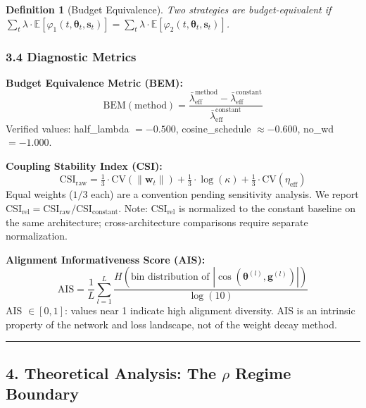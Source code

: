 \documentclass[
]{article}
\begin{document}
\textbf{Definition 1} (Budget Equivalence). \emph{Two strategies are
budget-equivalent if
\(\sum_{t} \lambda \cdot \mathbb{E}[\varphi_1(t, \boldsymbol{\theta}_t, \mathbf{s}_t)] = \sum_{t} \lambda \cdot \mathbb{E}[\varphi_2(t, \boldsymbol{\theta}_t, \mathbf{s}_t)]\).}

\hypertarget{diagnostic-metrics}{%
\subsubsection{3.4 Diagnostic Metrics}\label{diagnostic-metrics}}

\textbf{Budget Equivalence Metric (BEM):}
\[\mathrm{BEM}(\text{method}) = \frac{\bar{\lambda}_{\mathrm{eff}}^{\text{method}} - \bar{\lambda}_{\mathrm{eff}}^{\text{constant}}}{\bar{\lambda}_{\mathrm{eff}}^{\text{constant}}}\]
Verified values: half\_lambda \(= -0.500\), cosine\_schedule
\(\approx -0.600\), no\_wd \(= -1.000\).

\textbf{Coupling Stability Index (CSI):}
\[\mathrm{CSI}_{\mathrm{raw}} = \tfrac{1}{3} \cdot \mathrm{CV}(\|\mathbf{w}_t\|) + \tfrac{1}{3} \cdot \log(\kappa) + \tfrac{1}{3} \cdot \mathrm{CV}(\eta_{\mathrm{eff}})\]
Equal weights (\(1/3\) each) are a convention pending sensitivity
analysis. We report
\(\mathrm{CSI}_{\mathrm{rel}} = \mathrm{CSI}_{\mathrm{raw}} / \mathrm{CSI}_{\mathrm{constant}}\).
Note: \(\mathrm{CSI}_{\mathrm{rel}}\) is normalized to the constant
baseline on the same architecture; cross-architecture comparisons
require separate normalization.

\textbf{Alignment Informativeness Score (AIS):}
\[\mathrm{AIS} = \frac{1}{L}\sum_{l=1}^{L} \frac{H(\text{bin distribution of } |\cos(\boldsymbol{\theta}^{(l)}, \mathbf{g}^{(l)})|)}{\log(10)}\]
AIS \(\in [0, 1]\): values near 1 indicate high alignment diversity. AIS
is an intrinsic property of the network and loss landscape, not of the
weight decay method.

\begin{center}\rule{0.5\linewidth}{0.5pt}\end{center}

\hypertarget{theoretical-analysis-the-rho-regime-boundary}{%
\subsection{\texorpdfstring{4. Theoretical Analysis: The \(\rho\) Regime
Boundary}{4. Theoretical Analysis: The \textbackslash rho Regime Boundary}}\label{theoretical-analysis-the-rho-regime-boundary}}
\end{document}

